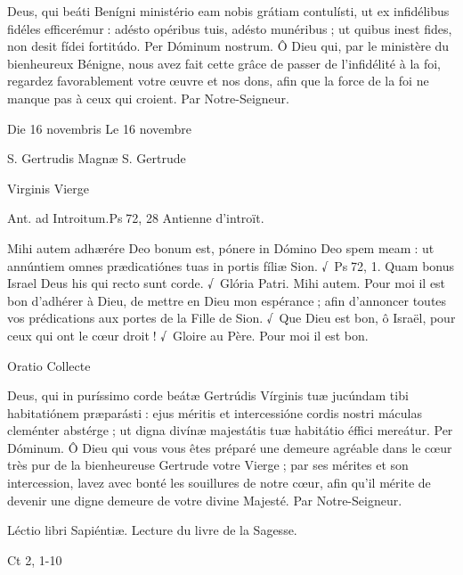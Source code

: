 \begin{paracol}{2}
Deus, qui beáti Benígni ministério  eam nobis grátiam contulísti, ut ex infidélibus fidéles efficerémur : adésto opéribus tuis, adésto munéribus ; ut quibus inest fides, non desit fídei fortitúdo. Per Dóminum nostrum.
\switchcolumn
Ô Dieu qui, par le ministère du bienheureux Bénigne, nous avez fait cette grâce de passer de l’infidélité à la foi, regardez favorablement votre œuvre et nos dons, afin que la force de la foi ne manque pas à ceux qui croient. Par Notre-Seigneur.
\switchcolumn*

Die 16 novembris
\switchcolumn
Le 16 novembre
\switchcolumn*

S. Gertrudis Magnæ
\switchcolumn
S. Gertrude
\switchcolumn*

Virginis
\switchcolumn
Vierge
\switchcolumn*

Ant. ad Introitum.\hfill Ps 72, 28
\switchcolumn
Antienne d’introït.
\switchcolumn*

Mihi autem adhærére Deo bonum  est, pónere in Dómino Deo spem meam : ut annúntiem omnes prædicatiónes tuas in portis fíliæ Sion. √~Ps 72, 1. Quam bonus Israel Deus his qui recto sunt corde. √~Glória Patri. Mihi autem.
\switchcolumn
Pour moi il est bon d’adhérer à Dieu,  de mettre en Dieu mon espérance ; afin d’annoncer toutes vos prédications aux portes de la Fille de Sion. √~Que Dieu est bon, ô Israël, pour ceux qui ont le cœur droit ! √~Gloire au Père. Pour moi il est bon.
\switchcolumn*

Oratio
\switchcolumn
Collecte
\switchcolumn*

Deus, qui in puríssimo corde beátæ  Gertrúdis Vírginis tuæ jucúndam tibi habitatiónem præparásti : ejus méritis et intercessióne cordis nostri máculas cleménter abstérge ; ut digna divínæ majestátis tuæ habitátio éffici mereátur. Per Dóminum.
\switchcolumn
Ô Dieu qui vous vous êtes préparé une  demeure agréable dans le cœur très pur de la bienheureuse Gertrude votre Vierge ; par ses mérites et son intercession, lavez avec bonté les souillures de notre cœur, afin qu’il mérite de devenir une digne demeure de votre divine Majesté. Par Notre-Seigneur.
\switchcolumn*

Léctio libri Sapiéntiæ.
\switchcolumn
Lecture du livre de la Sagesse.
\switchcolumn*

Ct 2, 1-10
\switchcolumn

\switchcolumn*


\end{paracol}
